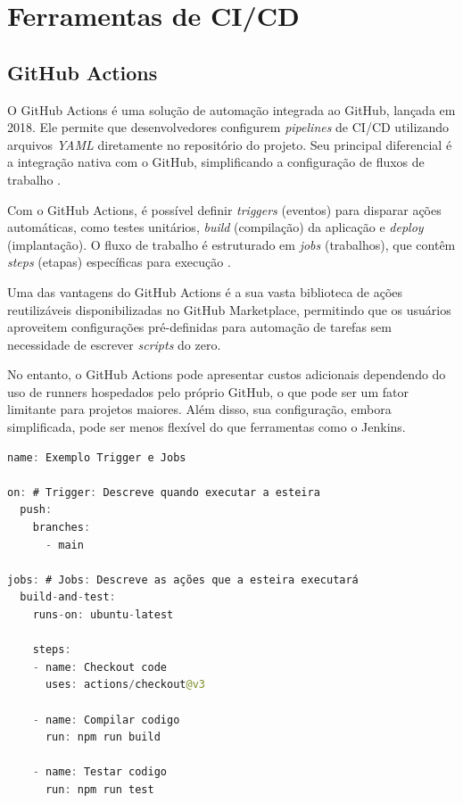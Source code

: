 \section{Ferramentas de CI/CD}

\subsection{GitHub Actions} \label{section:Github}

O GitHub Actions é uma solução de automação integrada ao GitHub, lançada em 2018. Ele permite que desenvolvedores configurem \textit{pipelines} de CI/CD utilizando arquivos \textit{YAML} diretamente no repositório do projeto. Seu principal diferencial é a integração nativa com o GitHub, simplificando a configuração de fluxos de trabalho \cite{GitHubGettingStarted}.

Com o GitHub Actions, é possível definir \textit{triggers} (eventos) para disparar ações automáticas, como testes unitários, \textit{build} (compilação) da aplicação e \textit{deploy} (implantação). O fluxo de trabalho é estruturado em \textit{jobs} (trabalhos), que contêm \textit{steps} (etapas) específicas para execução \cite{GitHubGettingStarted}.

Uma das vantagens do GitHub Actions é a sua vasta biblioteca de ações reutilizáveis disponibilizadas no GitHub Marketplace, permitindo que os usuários aproveitem configurações pré-definidas para automação de tarefas sem necessidade de escrever \textit{scripts} do zero.

No entanto, o GitHub Actions pode apresentar custos adicionais dependendo do uso de runners hospedados pelo próprio GitHub, o que pode ser um fator limitante para projetos maiores. Além disso, sua configuração, embora simplificada, pode ser menos flexível do que ferramentas como o Jenkins.

\begin{sourcecode}[htb]
\caption{\label{codigo:codigoGithub}Exemplo arquivo de configuração de \textit{pipeline} do GitHub}
\begin{lstlisting}[frame=single, language=Java]
name: Exemplo Trigger e Jobs

on: # Trigger: Descreve quando executar a esteira
  push:
    branches:
      - main

jobs: # Jobs: Descreve as ações que a esteira executará
  build-and-test: 
    runs-on: ubuntu-latest

    steps:
    - name: Checkout code
      uses: actions/checkout@v3

    - name: Compilar codigo
      run: npm run build

    - name: Testar codigo
      run: npm run test
\end{lstlisting}
\fonte{}
\end{sourcecode}

